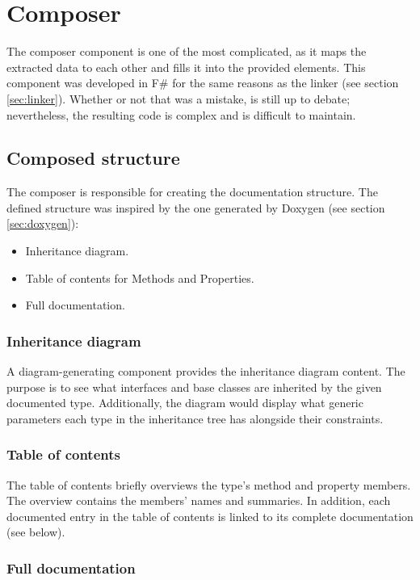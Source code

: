 \section{Composer}

The composer component is one of the most complicated, as it maps the extracted data to each other and fills it into the provided elements. This component was developed in F\# for the same reasons as the linker (see section \ref{sec:linker}). Whether or not that was a mistake, is still up to debate; nevertheless, the resulting code is complex and is difficult to maintain.

\subsection{Composed structure}

The composer is responsible for creating the documentation structure. The defined structure was inspired by the one generated by Doxygen (see section \ref{sec:doxygen}):
\begin{itemize}
    \item Inheritance diagram.
    \item Table of contents for Methods and Properties.
    \item Full documentation.
\end{itemize}

\subsubsection{Inheritance diagram}

A diagram-generating component provides the inheritance diagram content. The purpose is to see what interfaces and base classes are inherited by the given documented type. Additionally, the diagram would display what generic parameters each type in the inheritance tree has alongside their constraints.

\subsubsection{Table of contents}

The table of contents briefly overviews the type's method and property members. The overview contains the members' names and summaries. In addition, each documented entry in the table of contents is linked to its complete documentation (see below).

\subsubsection{Full documentation}

